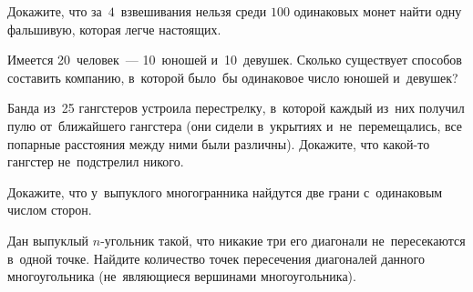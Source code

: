 \begin{problems}

Докажите, что за~$4$~взвешивания нельзя среди $100$ одинаковых монет найти
одну фальшивую, которая легче настоящих.

\item
Имеется 20~человек~--- 10~юношей и~10~девушек.
Сколько существует способов составить компанию, в~которой было~бы одинаковое
число юношей и~девушек?

\item
Банда из~25 гангстеров устроила перестрелку, в~которой каждый из~них получил
пулю от~ближайшего гангстера
(они сидели в~укрытиях и~не~перемещались, все попарные расстояния между ними
были различны).
Докажите, что какой-то гангстер не~подстрелил никого.

\item
Докажите, что у~выпуклого многогранника найдутся две грани с~одинаковым числом
сторон.

\item
Дан выпуклый $n$-угольник такой, что никакие три его диагонали не~пересекаются
в~одной точке.
Найдите количество точек пересечения диагоналей данного многоугольника
(не~являющиеся вершинами многоугольника).

\end{problems}

